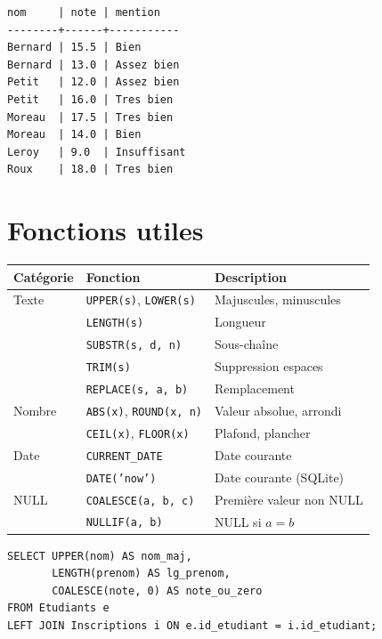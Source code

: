 \begin{codeoutput}
\begin{verbatim}
nom     | note | mention
--------+------+-----------
Bernard | 15.5 | Bien
Bernard | 13.0 | Assez bien
Petit   | 12.0 | Assez bien
Petit   | 16.0 | Tres bien
Moreau  | 17.5 | Tres bien
Moreau  | 14.0 | Bien
Leroy   | 9.0  | Insuffisant
Roux    | 18.0 | Tres bien
\end{verbatim}
\end{codeoutput}

\section{Fonctions utiles}

\begin{formules}[title=\textbf{Fonctions scalaires courantes}]
\begin{center}
\begin{tabular}{lll}
\toprule
\textbf{Cat\'egorie} & \textbf{Fonction} & \textbf{Description} \\
\midrule
Texte & \texttt{UPPER(s)}, \texttt{LOWER(s)} & Majuscules, minuscules \\
      & \texttt{LENGTH(s)} & Longueur \\
      & \texttt{SUBSTR(s, d, n)} & Sous-cha\^ine \\
      & \texttt{TRIM(s)} & Suppression espaces \\
      & \texttt{REPLACE(s, a, b)} & Remplacement \\
Nombre & \texttt{ABS(x)}, \texttt{ROUND(x, n)} & Valeur absolue, arrondi \\
       & \texttt{CEIL(x)}, \texttt{FLOOR(x)} & Plafond, plancher \\
Date   & \texttt{CURRENT\_DATE} & Date courante \\
       & \texttt{DATE('now')} & Date courante (SQLite) \\
NULL   & \texttt{COALESCE(a, b, c)} & Premi\`ere valeur non NULL \\
       & \texttt{NULLIF(a, b)} & NULL si $a = b$ \\
\bottomrule
\end{tabular}
\end{center}
\end{formules}

\begin{codeblock}[title=\textbf{Exemples de fonctions}]
\begin{verbatim}
SELECT UPPER(nom) AS nom_maj,
       LENGTH(prenom) AS lg_prenom,
       COALESCE(note, 0) AS note_ou_zero
FROM Etudiants e
LEFT JOIN Inscriptions i ON e.id_etudiant = i.id_etudiant;
\end{verbatim}
\end{codeblock}

